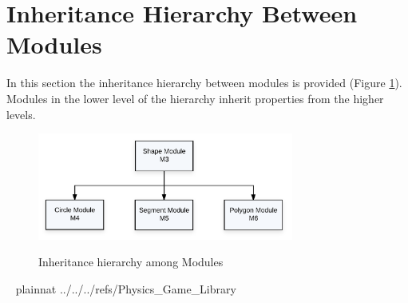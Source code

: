 \documentclass[12pt]{article}
\begin{document}
\section{Inheritance Hierarchy Between Modules} \label{SecInheritance}
In this section the inheritance hierarchy between modules is provided (Figure \ref{Fig_Inheritance}).
Modules in the lower level of the hierarchy inherit properties from the higher levels.
\begin{figure}[htbp]
\begin{center}
{
 \includegraphics[width=0.75\textwidth]{inherit.png}
}
\caption{\label{Fig_Inheritance}Inheritance hierarchy among Modules}
\end{center}
\end{figure}

~\newpage
 {plainnat}
 {../../../refs/Physics_Game_Library}
\end{document}
